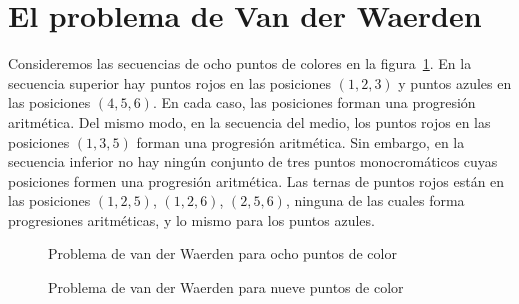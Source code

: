 
\section{El problema de Van der Waerden}\label{s.van}

Consideremos las secuencias de ocho puntos de colores en la figura~\ref{f.vdw1}. En la secuencia superior hay puntos rojos en las posiciones $(1,2,3)$ y puntos azules en las posiciones $(4,5,6)$. En cada caso, las posiciones forman una progresión aritmética. Del mismo modo, en la secuencia del medio, los puntos rojos en las posiciones $(1,3,5)$ forman una progresión aritmética. Sin embargo, en la secuencia inferior no hay ningún conjunto de tres puntos monocromáticos cuyas posiciones formen una progresión aritmética. 
Las ternas de puntos rojos están en las posiciones $(1,2,5)$, $(1,2,6)$, $(2,5,6)$, ninguna de las cuales forma progresiones aritméticas, y lo mismo para los puntos azules.

\begin{figure}[tb]
\begin{center}
\end{center}
\caption{Problema de van der Waerden para ocho puntos de color}\label{f.vdw1}
\end{figure}

\begin{figure}[b]
\begin{center}
\end{center}
\caption{Problema de van der Waerden para nueve puntos de color}\label{f.vdw2}
\end{figure}

